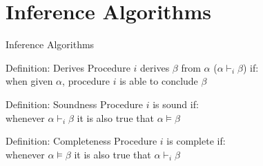 \documentclass[14pt]{beamer}
\begin{document}
\section{Inference Algorithms}
\begin{frame}{Inference Algorithms}
	\begin{block}{Definition: Derives}
		Procedure $i$ \alert{derives} $\beta$ from $\alpha$ ($\alpha \vdash_i \beta$) if:\\
		\hspace{1em} when given $\alpha$, procedure $i$ is able to conclude $\beta$
	\end{block}
	\pause
	\begin{block}{Definition: Soundness}
		Procedure $i$ is \alert{sound} if:\\
		\hspace{1em} whenever $\alpha \vdash_i \beta$ it is also true that $\alpha \models \beta$
	\end{block}
	\pause
	\begin{block}{Definition: Completeness}
		Procedure $i$ is \alert{complete} if:\\
		\hspace{1em} whenever $\alpha \models \beta$ it is also true that $\alpha \vdash_i \beta$
	\end{block}
\end{frame}
\end{document}
